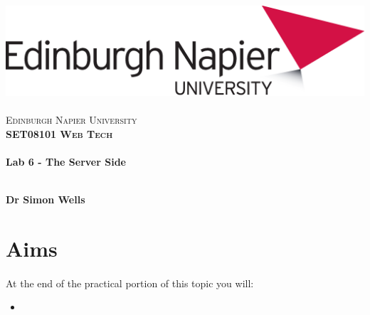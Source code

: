\documentclass[10pt, a4paper, twosize]{article}
\begin{document}

\begin{titlepage}
\vspace*{5cm}
\begin{center}
\includegraphics[width=.5\textwidth]{images/EdNapUniLogoCMYK}~\\[1cm]

\textsc{\Large Edinburgh Napier University}\\[1.5cm]

\textsc{\LARGE \bfseries SET08101 Web Tech}\\[0.5cm]

\hrulefill \\[0.4cm]
{\huge \bfseries Lab 6 - The Server Side \\[0.4cm] }
\hrulefill \\[1.5cm]

\begin{minipage}{0.4\textwidth}
\begin{flushleft} \large
\textbf{Dr Simon Wells} \\
\end{flushleft}
\end{minipage}

\vfill

\end{center}
\end{titlepage}




%

\section{Aims}
\paragraph{} At the end of the practical portion of this topic you will:

\begin{itemize}
\item \end{itemize}
\end{document}
